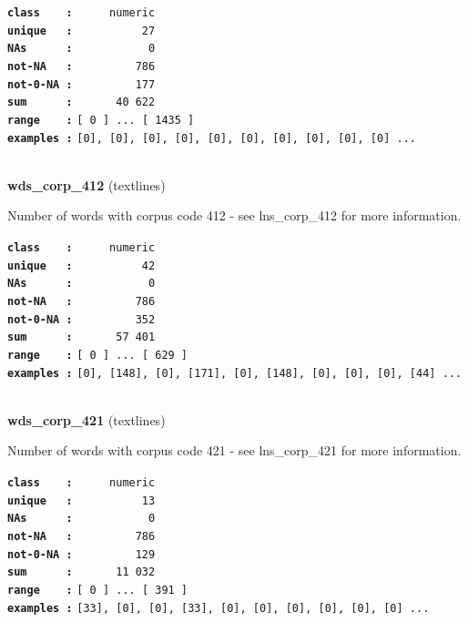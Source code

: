 \documentclass[]{article}
\begin{document}
\textbf{\texttt{class\ \ \ \ :}} \texttt{~~~~~numeric}\\
\textbf{\texttt{unique\ \ \ :}} \texttt{~~~~~~~~~~27}\\
\textbf{\texttt{NAs\ \ \ \ \ \ :}} \texttt{~~~~~~~~~~~0}\\
\textbf{\texttt{not-NA\ \ \ :}} \texttt{~~~~~~~~~786}\\
\textbf{\texttt{not-0-NA\ :}} \texttt{~~~~~~~~~177}\\
\textbf{\texttt{sum\ \ \ \ \ \ :}} \texttt{~~~~~~40~622}\\
\textbf{\texttt{range\ \ \ \ :}}
\texttt{{[}\ 0\ {]}\ ...\ {[}\ 1435\ {]}}\\
\textbf{\texttt{examples\ :}}
\texttt{{[}0{]},\ {[}0{]},\ {[}0{]},\ {[}0{]},\ {[}0{]},\ {[}0{]},\ {[}0{]},\ {[}0{]},\ {[}0{]},\ {[}0{]}\ ...}\\

~

\textbf{wds\_corp\_412} (textlines)

Number of words with corpus code 412 - see lns\_corp\_412 for more
information.

\textbf{\texttt{class\ \ \ \ :}} \texttt{~~~~~numeric}\\
\textbf{\texttt{unique\ \ \ :}} \texttt{~~~~~~~~~~42}\\
\textbf{\texttt{NAs\ \ \ \ \ \ :}} \texttt{~~~~~~~~~~~0}\\
\textbf{\texttt{not-NA\ \ \ :}} \texttt{~~~~~~~~~786}\\
\textbf{\texttt{not-0-NA\ :}} \texttt{~~~~~~~~~352}\\
\textbf{\texttt{sum\ \ \ \ \ \ :}} \texttt{~~~~~~57~401}\\
\textbf{\texttt{range\ \ \ \ :}}
\texttt{{[}\ 0\ {]}\ ...\ {[}\ 629\ {]}}\\
\textbf{\texttt{examples\ :}}
\texttt{{[}0{]},\ {[}148{]},\ {[}0{]},\ {[}171{]},\ {[}0{]},\ {[}148{]},\ {[}0{]},\ {[}0{]},\ {[}0{]},\ {[}44{]}\ ...}\\

~

\textbf{wds\_corp\_421} (textlines)

Number of words with corpus code 421 - see lns\_corp\_421 for more
information.

\textbf{\texttt{class\ \ \ \ :}} \texttt{~~~~~numeric}\\
\textbf{\texttt{unique\ \ \ :}} \texttt{~~~~~~~~~~13}\\
\textbf{\texttt{NAs\ \ \ \ \ \ :}} \texttt{~~~~~~~~~~~0}\\
\textbf{\texttt{not-NA\ \ \ :}} \texttt{~~~~~~~~~786}\\
\textbf{\texttt{not-0-NA\ :}} \texttt{~~~~~~~~~129}\\
\textbf{\texttt{sum\ \ \ \ \ \ :}} \texttt{~~~~~~11~032}\\
\textbf{\texttt{range\ \ \ \ :}}
\texttt{{[}\ 0\ {]}\ ...\ {[}\ 391\ {]}}\\
\textbf{\texttt{examples\ :}}
\texttt{{[}33{]},\ {[}0{]},\ {[}0{]},\ {[}33{]},\ {[}0{]},\ {[}0{]},\ {[}0{]},\ {[}0{]},\ {[}0{]},\ {[}0{]}\ ...}\\
\end{document}
